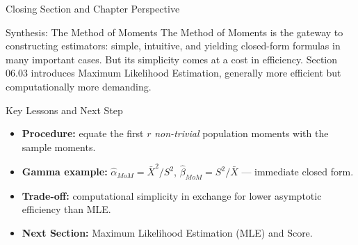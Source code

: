 \documentclass[aspectratio=169,xcolor={dvipsnames,table}]{beamer}
\begin{document}
\begin{frame}{Closing Section and Chapter Perspective}
	\vspace{-0.2cm}
	\begin{block}{Synthesis: The Method of Moments}
		\scriptsize
		The Method of Moments is the gateway to constructing estimators: simple, intuitive, and yielding closed-form formulas in many important cases. But its simplicity comes at a cost in efficiency. Section 06.03 introduces Maximum Likelihood Estimation, generally more efficient but computationally more demanding.
	\end{block}
	\vspace{0.05cm}
	\pause
	\begin{alertblock}{Key Lessons and Next Step}
		\begin{itemize}\itemsep=0.05cm
			\item \textbf{Procedure:} equate the first $r$ \emph{non-trivial} population moments with the sample moments.
			\item \textbf{Gamma example:} $\hat\alpha_{MoM}=\bar X^2/S^2$, $\hat\beta_{MoM}=S^2/\bar X$ --- immediate closed form.
			\item \textbf{Trade-off:} computational simplicity in exchange for lower asymptotic efficiency than MLE.
			\item \textbf{Next Section:} \textcolor{TecRojo}{Maximum Likelihood Estimation (MLE) and Score}.
		\end{itemize}
	\end{alertblock}
\end{frame}
\end{document}
